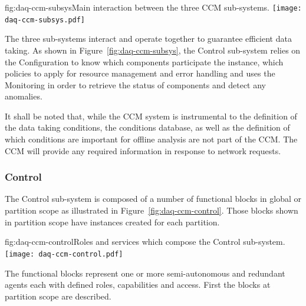 \begin{dunefigure}{fig:daq-ccm-subsys}{Main interaction between the three CCM sub-systems.}
  \texttt{[image: daq-ccm-subsys.pdf]}
\end{dunefigure}

The three  sub-systems interact and operate together to guarantee efficient data taking.  As shown in Figure~\ref{fig:daq-ccm-subsys}, the Control sub-system relies on the Configuration to know which components participate the  instance, which policies to apply for resource management and error handling and uses the Monitoring in order to retrieve the status of  components and detect any anomalies.

It shall be noted that, while the CCM system is instrumental to the definition of the data taking conditions, the conditions database, as well as the definition of which conditions are important for offline analysis are not part of the CCM. The CCM will provide any required information in response to network requests.

\subsubsection{Control}
\label{sec:daq:design:ccm:control}

The  Control sub-system is composed of a number of functional blocks in global or partition scope as illustrated in Figure~\ref{fig:daq-ccm-control}. 
Those blocks shown in partition scope have instances created for each partition. 


\begin{dunefigure}{fig:daq-ccm-control}{Roles and services which compose the  Control sub-system.}
  \texttt{[image: daq-ccm-control.pdf]}
\end{dunefigure}

The functional blocks represent one or more semi-autonomous and redundant agents each with defined roles, capabilities and access.  First the blocks at partition scope are described.

